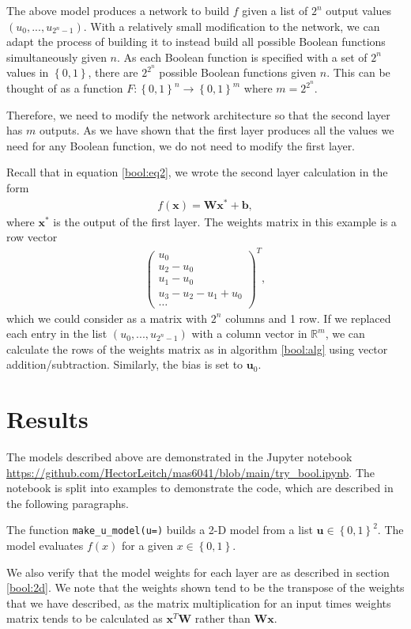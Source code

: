 \documentclass{somasmsc}
\begin{document}
The above model produces a network to build $f$ given a list of $2^n$ output values $\left(u_0, ..., u_{2^n-1}\right)$. With a relatively small modification to the network, we can adapt the process of building it to instead build all possible Boolean functions simultaneously given $n$. As each Boolean function is specified with a set of $2^n$ values in $\left\{0, 1\right\}$, there are $2^{2^n}$ possible Boolean functions given $n$. This can be thought of as a function $F : \left\{0, 1\right\}^n \rightarrow \left\{0, 1\right\}^m$ where $m=2^{2^n}$.

Therefore, we need to modify the network architecture so that the second layer has $m$ outputs. As we have shown that the first layer produces all the values we need for any Boolean function, we do not need to modify the first layer.

Recall that in equation \ref{bool:eq2}, we wrote the second layer calculation in the form
\begin{align*}
    f\left(\pmb{x}\right) = \mathbf{W}\pmb{x}^* + \pmb{b},
\end{align*}
where $\pmb{x}^*$ is the output of the first layer. The weights matrix in this example is a row vector
\begin{align*}
\begin{pmatrix}
    u_0 \\
    u_2 - u_0 \\
    u_1 - u_0 \\
    u_3 - u_2 - u_1 + u_0 \\
    \dots
\end{pmatrix}^T,
\end{align*}
which we could consider as a matrix with $2^n$ columns and 1 row. If we replaced each entry in the list $\left(u_0, ..., u_{2^n-1}\right)$ with a column vector in $\mathbb{R}^m$, we can calculate the rows of the weights matrix as in algorithm \ref{bool:alg} using vector addition/subtraction. Similarly, the bias is set to $\pmb{u}_0$.

\section{Results}

The models described above are demonstrated in the Jupyter notebook \url{https://github.com/HectorLeitch/mas6041/blob/main/try_bool.ipynb}. The notebook is split into examples to demonstrate the code, which are described in the following paragraphs.

\begin{exa}
The function \verb|make_u_model(u=)| builds a 2-D model from a list $\pmb{u} \in \left\{0, 1\right\}^2$. The model evaluates $f\left(x\right)$ for a given $x \in \left\{0, 1\right\}$.

We also verify that the model weights for each layer are as described in section \ref{bool:2d}. We note that the weights shown tend to be the transpose of the weights that we have described, as the matrix multiplication for an input times weights matrix tends to be calculated as $\pmb{x}^T\mathbf{W}$ rather than $\mathbf{W}\pmb{x}$.
\end{exa}
\end{document}
